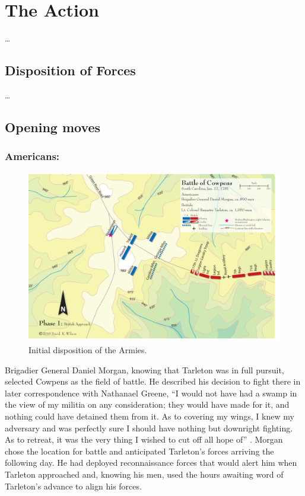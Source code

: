 \section{The Action}

\ldots

\subsection{Disposition of Forces}

\ldots

\subsection{Opening moves}

\subsubsection{Americans:}

\begin{figure}[ht]
    \begin{center}
    \includegraphics[width=\textwidth]{gfx/beiber01}
    \end{center}
    \caption{Initial disposition of the Armies.\cite{wilson_blogmap}}
    \label{beiber01}
\end{figure}



Brigadier General Daniel Morgan, knowing that Tarleton was in full pursuit,
selected Cowpens as the field of battle.  He described his decision to fight
there in later correspondence with Nathanael Greene, “I would not have had a
swamp in the view of my militia on any consideration; they would have made for
it, and nothing could have detained them from it.  As to covering my wings, I
knew my adversary and was perfectly sure I should have nothing but downright
fighting.  As to retreat, it was the very thing I wished to cut off all hope of”
\cite[46]{moncure_cowpens_1996}.  Morgan chose the location for battle and anticipated
Tarleton's forces arriving the following day.  He had deployed reconnaissance
forces that would alert him when Tarleton approached and, knowing his men, used
the hours awaiting word of Tarleton's advance to align his forces.

